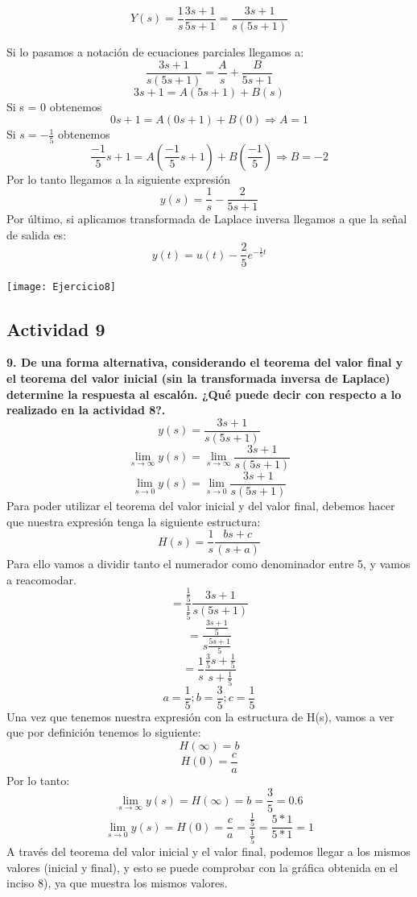 \begin{equation}
	Y(s)=\frac{1}{s}\frac{3s+1}{5s+1}=\frac{3s+1}{s(5s+1)}
\end{equation}

Si lo pasamos a notación de ecuaciones parciales llegamos a:
\begin{equation}
	\frac{3s+1}{s(5s+1)}=\frac{A}{s}+\frac{B}{5s+1}
\end{equation}
\begin{equation}
	{3s+1}=A(5s+1)+B(s)
\end{equation}
Si s = 0 obtenemos
\begin{equation}
	{0s+1}=A(0s+1)+B(0) \Rightarrow A=1
\end{equation}
Si $s = -\frac{1}{5}$ obtenemos
\begin{equation}
	{\frac{-1}{5}s+1}=A(\frac{-1}{5}s+1)+B(\frac{-1}{5}) \Rightarrow B=-2
\end{equation}
Por lo tanto llegamos a la siguiente expresión
\begin{equation}
	y(s)=\frac{1}{s}-\frac{2}{5s+1}
\end{equation}
Por último, si aplicamos transformada de Laplace inversa llegamos a que la señal de salida es:
\begin{equation}
	y(t)=u(t)-\frac{2}{5}e^{-\frac{1}{5}t}
\end{equation}

	\begin{center}
		\texttt{[image: Ejercicio8]}
	\end{center}

\subsection{Actividad 9}
\textbf{9. De una forma alternativa, considerando el teorema del valor final y el teorema del valor inicial (sin la transformada inversa de Laplace) determine la respuesta al escalón. ¿Qué puede decir con respecto a lo realizado en la actividad 8?.}
$$
y(s)=\frac{3s+1}{s(5s+1)}
$$
$$
\lim_{s \to \infty}y(s)=\lim_{s \to \infty}\frac{3s+1}{s(5s+1)}
$$
$$
\lim_{s \to 0}y(s)=\lim_{s \to 0}\frac{3s+1}{s(5s+1)}
$$
Para poder utilizar el teorema del valor inicial y del valor final, debemos hacer que nuestra expresión tenga la siguiente estructura:
$$
H(s)=\frac{1}{s}\frac{bs+c}{(s+a)}
$$
Para ello vamos a dividir tanto el numerador como denominador entre 5, y vamos a reacomodar.
$$
=\frac{\frac{1}{5}}{\frac{1}{5}}\frac{3s+1}{s(5s+1)}
$$
$$
=\frac{\frac{3s+1}{5}}{s{\frac{5s+1}{5}}}
$$
$$
=\frac{1}{s}\frac{\frac{3}{5}s+\frac{1}{5}}{s+\frac{1}{5}}
$$
$$
a=\frac{1}{5};b=\frac{3}{5};c=\frac{1}{5}
$$
Una vez que tenemos nuestra  expresión con la estructura de H(s), vamos a ver que por definición tenemos lo siguiente:
$$
H(\infty)=b
$$
$$
H(0)=\frac{c}{a}
$$
Por lo tanto:
$$
\lim_{s \to \infty}y(s)=H(\infty)=b=\frac{3}{5}=0.6
$$
$$
\lim_{s \to 0}y(s)=H(0)=\frac{c}{a}=\frac{\frac{1}{5}}{\frac{1}{5}}=
\frac{5*1}{5*1}=1
$$
A través del teorema del valor inicial y el valor final, podemos llegar a los mismos valores (inicial y final), y esto se puede comprobar con la gráfica obtenida en el inciso 8), ya que muestra los mismos valores.
